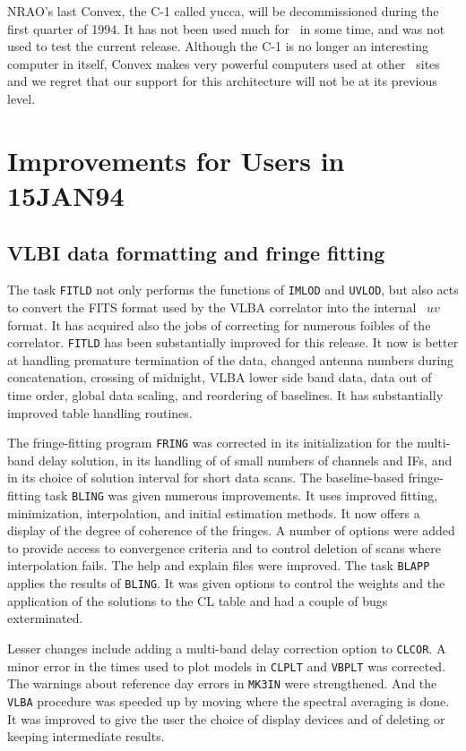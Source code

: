 NRAO's last Convex, the C-1 called yucca, will be decommissioned during
the first quarter of 1994.  It has not been used much for \AIPS\ in
some time, and was not used to test the current release.  Although the
C-1 is no longer an interesting computer in itself, Convex makes very
powerful computers used at other \AIPS\ sites and we regret that our
support for this architecture will not be at its previous level.

\eject
\section{Improvements for Users in 15JAN94}

\subsection{VLBI data formatting and fringe fitting}

The task {\tt FITLD} not only performs the functions of {\tt IMLOD}
and {\tt UVLOD}, but also acts to convert the FITS format used by the
VLBA correlator into the internal \AIPS\ $uv$ format.  It has acquired
also the jobs of correcting for numerous foibles of the correlator.
{\tt FITLD} has been substantially improved for this release.  It now
is better at handling premature termination of the data, changed
antenna numbers during concatenation, crossing of midnight, VLBA lower
side band data, data out of time order, global data scaling, and
reordering of baselines.  It has substantially improved table handling
routines.

The fringe-fitting program {\tt FRING} was corrected in its
initialization for the multi-band delay solution, in its handling of of
small numbers of channels and IFs, and in its choice of solution
interval for short data scans.  The baseline-based fringe-fitting task
{\tt BLING} was given numerous improvements.  It uses improved
fitting, minimization, interpolation, and initial estimation methods.
It now offers a display of the degree of coherence of the fringes.  A
number of options were added to provide access to convergence criteria
and to control deletion of scans where interpolation fails.  The help
and explain files were improved.  The task {\tt BLAPP} applies the
results of \hbox{{\tt BLING}}.  It was given options to control the
weights and the application of the solutions to the CL table and had a
couple of bugs exterminated.

Lesser changes include adding a multi-band delay correction option to
\hbox{{\tt CLCOR}}.  A minor error in the times used to plot models in
{\tt CLPLT} and {\tt VBPLT} was corrected.  The warnings about
reference day errors in {\tt MK3IN} were strengthened.  And the {\tt
VLBA} procedure was speeded up by moving where the spectral averaging
is done.  It was improved to give the user the choice of display
devices and of deleting or keeping intermediate results.

